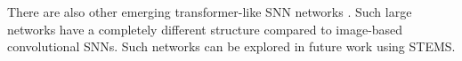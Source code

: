There are also other emerging transformer-like SNN networks \cite{yao2023spikedriven}. Such large networks have a completely different structure compared to image-based convolutional SNNs. Such networks can be explored in future work using STEMS.




